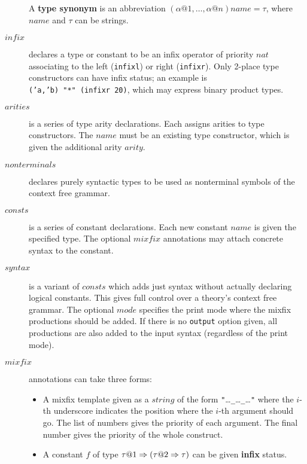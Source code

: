 \begin{description}
  A {\bf type synonym} is an abbreviation
  $(\alpha@1,\dots,\alpha@n)name = \tau$, where $name$ and $\tau$ can
  be strings.

\item[$infix$]
  declares a type or constant to be an infix operator of priority $nat$
  associating to the left (\texttt{infixl}) or right (\texttt{infixr}).  Only
  2-place type constructors can have infix status; an example is {\tt
  ('a,'b)~"*"~(infixr~20)}, which may express binary product types.

\item[$arities$] is a series of type arity declarations.  Each assigns
  arities to type constructors.  The $name$ must be an existing type
  constructor, which is given the additional arity $arity$.
  
\item[$nonterminals$] declares purely
  syntactic types to be used as nonterminal symbols of the context
  free grammar.

\item[$consts$] is a series of constant declarations.  Each new
  constant $name$ is given the specified type.  The optional $mixfix$
  annotations may attach concrete syntax to the constant.
  
\item[$syntax$]  is a variant
  of $consts$ which adds just syntax without actually declaring
  logical constants.  This gives full control over a theory's context
  free grammar.  The optional $mode$ specifies the print mode where the
  mixfix productions should be added.  If there is no \texttt{output}
  option given, all productions are also added to the input syntax
  (regardless of the print mode).

\item[$mixfix$] 
  annotations can take three forms:
  \begin{itemize}
  \item A mixfix template given as a $string$ of the form
    {\tt"}\dots{\tt\_}\dots{\tt\_}\dots{\tt"} where the $i$-th underscore
    indicates the position where the $i$-th argument should go.  The list
    of numbers gives the priority of each argument.  The final number gives
    the priority of the whole construct.

  \item A constant $f$ of type $\tau@1\To(\tau@2\To\tau)$ can be given {\bf
    infix} status.


\end{itemize}
\end{description}
